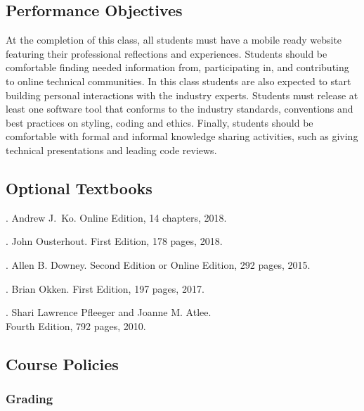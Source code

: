 \documentclass[11pt]{article}
\begin{document}
\subsection*{Performance Objectives}

At the completion of this class, all students must have a mobile ready website
featuring their professional reflections and experiences. Students should be
comfortable finding needed information from, participating in, and contributing
to online technical communities. In this class students are also expected to
start building personal interactions with the industry experts. Students must
release at least one software tool that conforms to the industry standards,
conventions and best practices on styling, coding and ethics. Finally, students
should be comfortable with formal and informal knowledge sharing activities,
such as giving technical presentations and leading code reviews.

\subsection*{Optional Textbooks}

. Andrew J.\ Ko.
Online Edition, 14 chapters, 2018.
%
\vspace*{.25em}

. John Ousterhout.
First Edition, 178 pages, 2018.
%
\vspace*{.25em}

. Allen B. Downey.
Second Edition or Online Edition, 292 pages, 2015.
%
\vspace*{.25em}

. Brian Okken.
First Edition, 197 pages, 2017.
%
\vspace*{.5em}

. Shari Lawrence
Pfleeger and Joanne M. Atlee.\\ Fourth Edition, 792 pages, 2010.

\vspace*{-.25em}
\subsection*{Course Policies}

\subsubsection*{Grading}
\end{document}
